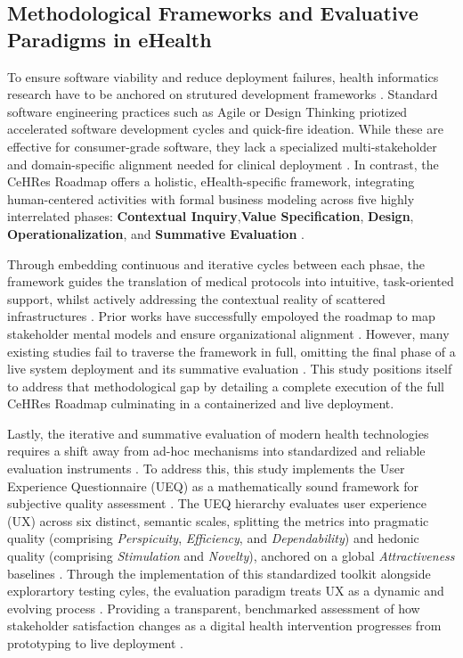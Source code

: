 \documentclass[manuscript, screen, review]{acmart}
\begin{document}
\subsection{Methodological Frameworks and Evaluative Paradigms in eHealth}
\label{sub:methdological_frameworks_evaluation}
To ensure software viability and reduce deployment failures, health informatics research have to be anchored on strutured development frameworks \cite{Kip2025CeHRes}. Standard software engineering practices such as Agile or Design Thinking priotized accelerated software development cycles and quick-fire ideation. While these are effective for consumer-grade software, they lack a specialized multi-stakeholder and domain-specific alignment needed for clinical deployment \cite{Kip2025CeHRes}. In contrast, the CeHRes Roadmap offers a holistic, eHealth-specific framework, integrating human-centered activities with formal business modeling across five highly interrelated phases: \textbf{Contextual Inquiry},\textbf{Value Specification}, \textbf{Design}, \textbf{Operationalization}, and \textbf{Summative Evaluation} \cite{Kip2025CeHRes,vanVelsen2012Personas}. 

Through embedding continuous and iterative cycles between each phsae, the framework guides the translation of medical protocols into intuitive, task-oriented support, whilst actively addressing the contextual reality of scattered infrastructures \cite{wentzel_keeping_an_eye,Kip2025CeHRes}. Prior works have successfully empoloyed the roadmap to map stakeholder mental models and ensure organizational alignment \cite{wentzel_keeping_an_eye}. However, many existing studies fail to traverse the framework in full, omitting the final phase of a live system deployment and its summative evaluation \cite{ganjali_2024_ivrs}. This study positions itself to address that methodological gap by detailing a complete execution of the full CeHRes Roadmap culminating in a containerized and live deployment. 

Lastly, the iterative and summative evaluation of modern health technologies requires a shift away from ad-hoc mechanisms into standardized and reliable evaluation instruments \cite{sharifikia_2022_health,woodard_2018_the}. To address this, this study implements the User Experience Questionnaire (UEQ) as a mathematically sound framework for subjective quality assessment \cite{aldikushendriawan_2021_evaluating}. The UEQ hierarchy evaluates user experience (UX) across six distinct, semantic scales, splitting the metrics into pragmatic quality (comprising \textit{Perspicuity}, \textit{Efficiency}, and \textit{Dependability}) and hedonic quality (comprising \textit{Stimulation} and \textit{Novelty}), anchored on a global \textit{Attractiveness} baselines \cite{laugwitz_2008_construction}. Through the implementation of this standardized toolkit alongside explorartory testing cyles, the evaluation paradigm treats UX as a dynamic and evolving process \cite{laugwitz_2008_construction,schrepp_2023_user}. Providing a transparent, benchmarked assessment of how stakeholder satisfaction changes as a digital health intervention progresses from prototyping to live deployment \cite{hinderks_user,schrepp_2023_user}. 
\end{document}
